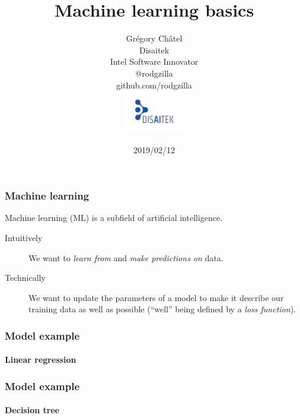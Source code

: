 \documentclass[9pt]{beamer}
\title{Machine learning basics}
\author[G. Châtel]{Grégory Châtel\\\vspace{0.3cm}Disaitek\\Intel Software Innovator\\\vspace{0.3cm}@rodgzilla\\github.com/rodgzilla\\\vspace{.5cm}\includegraphics[width = 2.5cm]{images/logo_disaitek.png} \vspace{-1cm}
}
\date{2019/02/12}
\begin{document}
\begin{frame}

  \maketitle

\end{frame}

\begin{frame}

  \frametitle{Machine learning}

  Machine learning (ML) is a subfield of artificial intelligence.

  \bigskip

  \begin{description}
    \item[Intuitively] We want to \emph{learn from} and \emph{make predictions
    on} data.

      \medskip

    \item[Technically] We want to update the parameters of a model to
      make it describe our training data as well as possible (``well''
      being defined by a \emph{loss function}).
  \end{description}

\end{frame}

\begin{frame}
  \frametitle{Model example}

  \framesubtitle{Linear regression}

  \begin{center}
    \scalebox{1.3}{
      
    }
  \end{center}

\end{frame}

\begin{frame}
  \frametitle{Model example}

  \framesubtitle{Decision tree}

  \begin{center}
    
  \end{center}

\end{frame}
\end{document}
